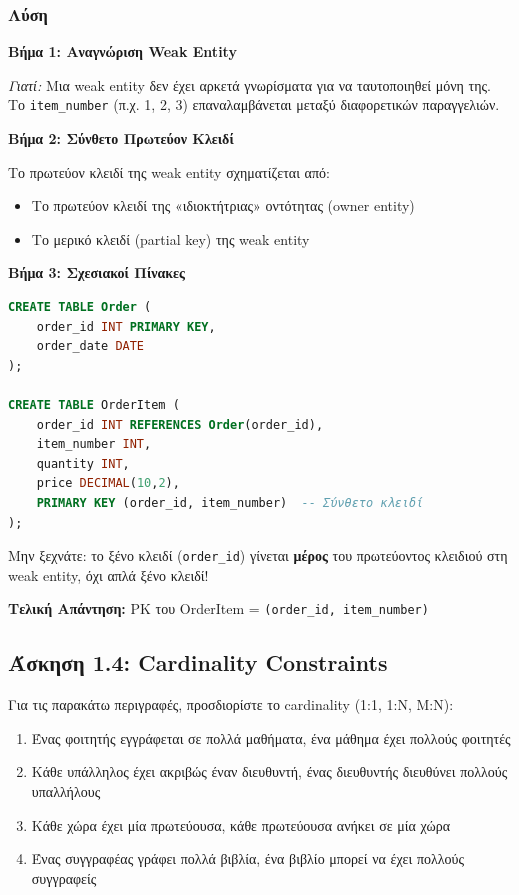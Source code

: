 \subsubsection*{Λύση}

\textbf{Βήμα 1: Αναγνώριση Weak Entity}

\textit{Γιατί:} Μια weak entity δεν έχει αρκετά γνωρίσματα για να ταυτοποιηθεί μόνη
της. Το \texttt{item\_number} (π.χ. 1, 2, 3) επαναλαμβάνεται μεταξύ διαφορετικών
παραγγελιών.

\textbf{Βήμα 2: Σύνθετο Πρωτεύον Κλειδί}

Το πρωτεύον κλειδί της weak entity σχηματίζεται από:
\begin{itemize}
    \item Το πρωτεύον κλειδί της «ιδιοκτήτριας» οντότητας (owner entity)
    \item Το μερικό κλειδί (partial key) της weak entity
\end{itemize}

\textbf{Βήμα 3: Σχεσιακοί Πίνακες}

\begin{lstlisting}[language=SQL]
CREATE TABLE Order (
    order_id INT PRIMARY KEY,
    order_date DATE
);

CREATE TABLE OrderItem (
    order_id INT REFERENCES Order(order_id),
    item_number INT,
    quantity INT,
    price DECIMAL(10,2),
    PRIMARY KEY (order_id, item_number)  -- Σύνθετο κλειδί
);
\end{lstlisting}

\begin{warningbox}
Μην ξεχνάτε: το ξένο κλειδί (\texttt{order\_id}) γίνεται \textbf{μέρος} του
πρωτεύοντος κλειδιού στη weak entity, όχι απλά ξένο κλειδί!
\end{warningbox}

\textbf{Τελική Απάντηση:} PK του OrderItem = \texttt{(order\_id, item\_number)}

\subsection{Άσκηση 1.4: Cardinality Constraints}

\begin{formulabox}[Εκφώνηση]
Για τις παρακάτω περιγραφές, προσδιορίστε το cardinality (1:1, 1:N, M:N):

\begin{enumerate}
    \item Ένας φοιτητής εγγράφεται σε πολλά μαθήματα, ένα μάθημα έχει πολλούς φοιτητές
    \item Κάθε υπάλληλος έχει ακριβώς έναν διευθυντή, ένας διευθυντής διευθύνει πολλούς υπαλλήλους
    \item Κάθε χώρα έχει μία πρωτεύουσα, κάθε πρωτεύουσα ανήκει σε μία χώρα
    \item Ένας συγγραφέας γράφει πολλά βιβλία, ένα βιβλίο μπορεί να έχει πολλούς συγγραφείς
\end{enumerate}
\end{formulabox}

